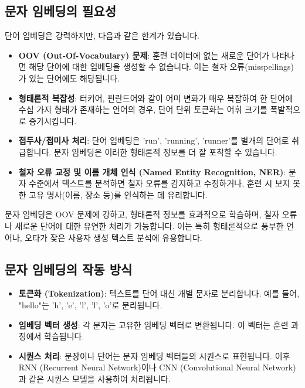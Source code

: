\documentclass[11pt,a4paper]{article}
\theoremstyle{definition}
\begin{document}
\subsection{문자 임베딩의 필요성}
단어 임베딩은 강력하지만, 다음과 같은 한계가 있습니다.

\begin{itemize}
    \item \textbf{OOV (Out-Of-Vocabulary) 문제}: 훈련 데이터에 없는 새로운 단어가 나타나면 해당 단어에 대한 임베딩을 생성할 수 없습니다. 이는 철자 오류(misspellings)가 있는 단어에도 해당됩니다.
    \item \textbf{형태론적 복잡성}: 터키어, 핀란드어와 같이 어미 변화가 매우 복잡하여 한 단어에 수십 가지 형태가 존재하는 언어의 경우, 단어 단위 토큰화는 어휘 크기를 폭발적으로 증가시킵니다.
    \item \textbf{접두사/접미사 처리}: 단어 임베딩은 'run', 'running', 'runner'를 별개의 단어로 취급합니다. 문자 임베딩은 이러한 형태론적 정보를 더 잘 포착할 수 있습니다.
    \item \textbf{철자 오류 교정 및 이름 개체 인식 (Named Entity Recognition, NER)}: 문자 수준에서 텍스트를 분석하면 철자 오류를 감지하고 수정하거나, 훈련 시 보지 못한 고유 명사(이름, 장소 등)를 인식하는 데 유리합니다.
\end{itemize}

\begin{infobox}
문자 임베딩은 OOV 문제에 강하고, 형태론적 정보를 효과적으로 학습하며, 철자 오류나 새로운 단어에 대한 유연한 처리가 가능합니다. 이는 특히 형태론적으로 풍부한 언어나, 오타가 잦은 사용자 생성 텍스트 분석에 유용합니다.
\end{infobox}

\subsection{문자 임베딩의 작동 방식}
\begin{itemize}
    \item \textbf{토큰화 (Tokenization)}: 텍스트를 단어 대신 개별 문자로 분리합니다. 예를 들어, "hello"는 'h', 'e', 'l', 'l', 'o'로 분리됩니다.
    \item \textbf{임베딩 벡터 생성}: 각 문자는 고유한 임베딩 벡터로 변환됩니다. 이 벡터는 훈련 과정에서 학습됩니다.
    \item \textbf{시퀀스 처리}: 문장이나 단어는 문자 임베딩 벡터들의 시퀀스로 표현됩니다. 이후 RNN (Recurrent Neural Network)이나 CNN (Convolutional Neural Network)과 같은 시퀀스 모델을 사용하여 처리됩니다.
\end{itemize}
\end{document}
